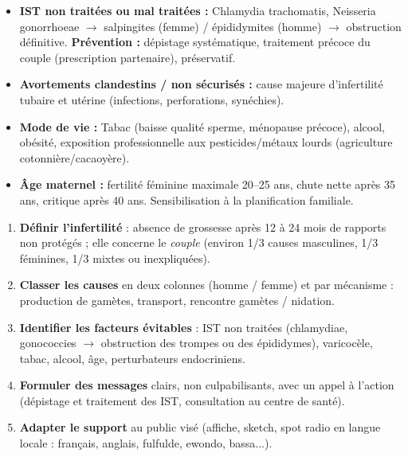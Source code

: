 \documentclass[11pt]{article}
\begin{document}
\begin{attention}
\begin{itemize}
\item \textbf{IST non traitées ou mal traitées :} Chlamydia trachomatis, Neisseria gonorrhoeae $\rightarrow$ salpingites (femme) / épididymites (homme) $\rightarrow$ obstruction définitive. \textbf{Prévention :} dépistage systématique, traitement précoce du couple (prescription partenaire), préservatif.
\item \textbf{Avortements clandestins / non sécurisés :} cause majeure d'infertilité tubaire et utérine (infections, perforations, synéchies).
\item \textbf{Mode de vie :} Tabac (baisse qualité sperme, ménopause précoce), alcool, obésité, exposition professionnelle aux pesticides/métaux lourds (agriculture cotonnière/cacaoyère).
\item \textbf{Âge maternel :} fertilité féminine maximale 20--25 ans, chute nette après 35 ans, critique après 40 ans. Sensibilisation à la planification familiale.
\end{itemize}
\end{attention}

\begin{methode}
\begin{enumerate}
\item \textbf{Définir l'infertilité} : absence de grossesse après 12 à 24 mois de rapports non protégés ; elle concerne le \emph{couple} (environ 1/3 causes masculines, 1/3 féminines, 1/3 mixtes ou inexpliquées).
\item \textbf{Classer les causes} en deux colonnes (homme / femme) et par mécanisme : production de gamètes, transport, rencontre gamètes / nidation.
\item \textbf{Identifier les facteurs évitables} : IST non traitées (chlamydiae, gonococcies $\rightarrow$ obstruction des trompes ou des épididymes), varicocèle, tabac, alcool, âge, perturbateurs endocriniens.
\item \textbf{Formuler des messages} clairs, non culpabilisants, avec un appel à l'action (dépistage et traitement des IST, consultation au centre de santé).
\item \textbf{Adapter le support} au public visé (affiche, sketch, spot radio en langue locale : français, anglais, fulfulde, ewondo, bassa...).
\end{enumerate}
\end{methode}
\end{document}
